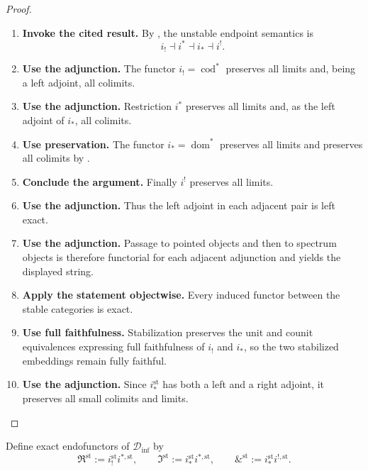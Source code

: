 \begin{proof}
\leavevmode
\begin{enumerate}[label=\textup{(\arabic*)}]
    \item \textbf{Invoke the cited result.}
    By , the unstable endpoint semantics is
    \[
        i_!\dashv i^*\dashv i_*\dashv i^!.
    \]

    \item \textbf{Use the adjunction.}
    The functor \(i_!=\operatorname{cod}^*\) preserves all limits and, being a left adjoint, all colimits.

    \item \textbf{Use the adjunction.}
    Restriction \(i^*\) preserves all limits and, as the left adjoint of \(i_*\), all
    colimits.

    \item \textbf{Use preservation.}
    The functor \(i_*=\operatorname{dom}^*\) preserves all limits and preserves all colimits by
    .

    \item \textbf{Conclude the argument.}
    Finally \(i^!\) preserves all limits.

    \item \textbf{Use the adjunction.}
    Thus the left adjoint in each adjacent pair is left exact.

    \item \textbf{Use the adjunction.}
    Passage to pointed objects and then to spectrum objects is therefore functorial for each
    adjacent adjunction and yields the displayed string.

    \item \textbf{Apply the statement objectwise.}
    Every induced functor between the stable categories is exact.

    \item \textbf{Use full faithfulness.}
    Stabilization preserves the unit and counit equivalences expressing full faithfulness of
    \(i_!\) and \(i_*\), so the two stabilized embeddings remain fully faithful.

    \item \textbf{Use the adjunction.}
    Since \(i_*^{\mathrm{st}}\) has both a left and a right adjoint, it preserves all small colimits and
    limits.
\end{enumerate}
\end{proof}

\begin{definition}
\label{def:stable-differential-cohesive-modalities}
Define exact endofunctors of \(\mathcal D_{\inf}\) by
\[
    \Re^{\mathrm{st}}
    :=
    i_!^{\mathrm{st}}i^{*,\mathrm{st}},
    \qquad
    \Im^{\mathrm{st}}
    :=
    i_*^{\mathrm{st}}i^{*,\mathrm{st}},
    \qquad
    \&^{\mathrm{st}}
    :=
    i_*^{\mathrm{st}}i^{!,\mathrm{st}}.
\]
\end{definition}

